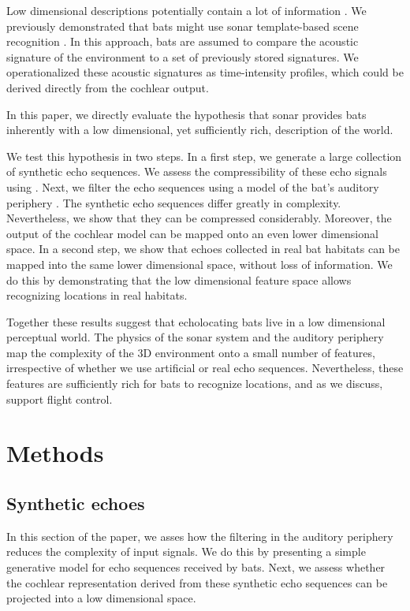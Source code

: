 \documentclass[preprint,5p]{elsarticle}
\begin{document}
Low dimensional descriptions potentially contain a lot of information \citep{Kuc1997b,Kuc1997}. We previously demonstrated that bats might use sonar template-based scene recognition \citep{Vanderelst2016,Vanderelst2017}. In this approach, bats are assumed to compare the acoustic signature of the environment to a set of previously stored signatures. We operationalized these acoustic signatures as time-intensity profiles, which could be derived directly from the cochlear output.

In this paper, we directly evaluate the hypothesis that sonar provides bats inherently with a low dimensional, yet sufficiently rich, description of the world.

We test this hypothesis in two steps. In a first step, we generate a large collection of synthetic echo sequences. We assess the compressibility of these echo signals using \PCA. Next, we filter the echo sequences using a model of the bat's auditory periphery \citep{Wiegrebe2008}. The synthetic echo sequences differ greatly in complexity. Nevertheless, we show that they can be compressed considerably. Moreover, the output of the cochlear model can be mapped onto an even lower dimensional space. In a second step, we show that echoes collected in real bat habitats can be mapped into the same lower dimensional space, without loss of information. We do this by demonstrating that the low dimensional feature space allows recognizing locations in real habitats. 

Together these results suggest that echolocating bats live in a low dimensional perceptual world. The physics of the sonar system and the auditory periphery map the complexity of the 3D environment onto a small number of features, irrespective of whether we use artificial or real echo sequences. Nevertheless, these features are sufficiently rich for bats to recognize locations, and as we discuss, support flight control.

\section{Methods}

\subsection{Synthetic echoes}

In this section of the paper, we asses how the filtering in the auditory periphery reduces the complexity of input signals. We do this by presenting a simple generative model for echo sequences received by bats. Next, we assess whether the cochlear representation derived from these synthetic echo sequences can be projected into a low dimensional space. 
\end{document}
